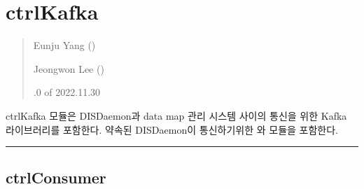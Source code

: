\documentclass[a4paper,10pt,english]{sphinxmanual}
\begin{document}
\section{ctrlKafka}
\label{\detokenize{_ctrlKafka:ctrlkafka}}\label{\detokenize{_ctrlKafka:id1}}\label{\detokenize{_ctrlKafka::doc}}\begin{quote}\begin{description}
\begin{DUlineblock}{0em}
\item[] Eunju Yang ()
\item[] Jeongwon Lee ()
\end{DUlineblock}

.0 of 2022.11.30

\end{description}\end{quote}

\sphinxAtStartPar
ctrlKafka 모듈은 DISDaemon과 data map 관리 시스템 사이의 통신을 위한 Kafka 라이브러리를 포함한다.
약속된 DISDaemon이 통신하기위한 {\hyperref[\detokenize{_ctrlKafka:ctrlconsumer}]{}} 와 {\hyperref[\detokenize{_ctrlKafka:ctrlproducer}]{}} 모듈을 포함한다.


\bigskip\hrule\bigskip



\subsection{ctrlConsumer}
\label{\detokenize{_ctrlKafka:ctrlconsumer}}
\end{document}
